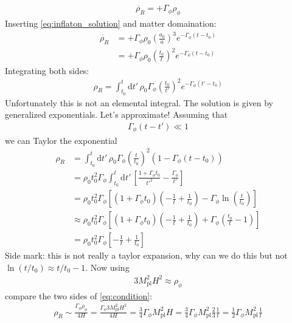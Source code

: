 \documentclass[13pt,a4paper]{article}
\begin{document}
\begin{align}
    \dot{\rho_R} = + \Gamma_\phi \rho_\phi
\end{align}
Inserting \eqref{eq:inflaton_solution} and matter domaination:
\begin{align}
    \dot{\rho_R} &= + \Gamma_\phi \rho_0 \left( \frac{a_0}{a} \right)^3 e^{- \Gamma_\phi (t - t_0)} \\
    &=  + \Gamma_\phi \rho_0 \left( \frac{t_0}{t} \right)^2 e^{- \Gamma_\phi (t - t_0)}
\end{align}
Integrating both sides:
\begin{align}
    \rho_R = \int_{t_0}^t \mathrm{d} t' \, \rho_0 \Gamma_\phi \left( \frac{t_0}{t'} \right)^2 e^{- \Gamma_\phi (t' - t_0)}
\end{align}
Unfortunately this is not an elemental integral. The solution is given by generalized exponentials.
Let's approximate!
Assuming that
\begin{align}
    \Gamma_\phi(t - t') \ll 1
\end{align}
we can Taylor the exponential
\begin{align}
    \rho_R &= \int_{t_0}^t \mathrm{d} t' \, \rho_0 \Gamma_\phi \left( \frac{t}{t_0} \right)^2 \left(1 - \Gamma_\phi (t - t_0) \right) \\
    &= \rho_0 t_0^2 \Gamma_\phi \int_{t_0}^t \mathrm{d} t' \, \left[ \frac{1 + \Gamma_\phi t_0}{t'^2} - \frac{\Gamma_\phi}{t'} \right]  \\
    &= \rho_0 t_0^2 \Gamma_\phi \left[ (1 + \Gamma_\phi t_0) \left( - \frac{1}{t} + \frac{1}{t_0} \right) - \Gamma_\phi \ln \left( \frac{t}{t_0} \right) \right] \\
    &\approx \rho_0 t_0^2 \Gamma_\phi \left[ (1 + \Gamma_\phi t_0) \left( - \frac{1}{t} + \frac{1}{t_0} \right) + \Gamma_\phi \left( \frac{t_0}{t} - 1\right) \right] \\
   &= \rho_0 t_0^2 \Gamma_\phi \left[  - \frac{1}{t} + \frac{1}{t_0}  \right]
\end{align}
Side mark: this is not really a taylor expansion, why can we do this but not $\ln(t / t_0) \approx t / t_0 - 1$.
Now using
\begin{align}
    3 M_{\mathrm{pl}}^2 H^2 \approx \rho_\phi
\end{align}
compare the two sides of \eqref{eq:condition}:
\begin{align}
   \rho_R \sim \frac{\Gamma_\phi \rho_\phi}{4 H}
   =  \frac{\Gamma_\phi 3 M_{\mathrm{pl}}^2 H^2}{4 H}
   = \frac{3}{4} \Gamma_\phi M_{\mathrm{pl}}^2 H
   = \frac{3}{4} \Gamma_\phi M_{\mathrm{pl}}^2 \frac{2}{3} \frac{1}{t}
   = \frac{1}{2} \Gamma_\phi M_{\mathrm{pl}}^2 \frac{1}{t}
\end{align}
\end{document}

